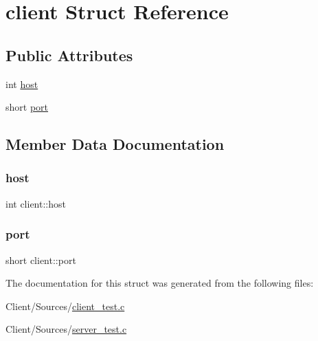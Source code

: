 \hypertarget{structclient}{}\section{client Struct Reference}
\label{structclient}
\subsection*{Public Attributes}
\begin{DoxyCompactItemize}
\item 
int \hyperlink{structclient_aa8a88ab82022342f861ef3207a247e22}{host}
\item 
short \hyperlink{structclient_a4ccd9d5116672d574543f747f7982ac4}{port}
\end{DoxyCompactItemize}


\subsection{Member Data Documentation}
\mbox{\label{structclient_aa8a88ab82022342f861ef3207a247e22}} 
\subsubsection{\texorpdfstring{host}{host}}
{\footnotesize\ttfamily int client\+::host}

\mbox{\label{structclient_a4ccd9d5116672d574543f747f7982ac4}} 
\subsubsection{\texorpdfstring{port}{port}}
{\footnotesize\ttfamily short client\+::port}



The documentation for this struct was generated from the following files\+:\begin{DoxyCompactItemize}
\item 
Client/\+Sources/\hyperlink{client__test_8c}{client\+\_\+test.\+c}\item 
Client/\+Sources/\hyperlink{server__test_8c}{server\+\_\+test.\+c}\end{DoxyCompactItemize}
